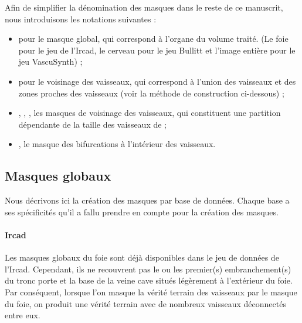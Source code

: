 Afin de simplifier la dénomination des masques dans le reste de ce manuscrit, nous introduisons les notations suivantes :
\begin{itemize}
  \item \maskglobal pour le masque global, qui correspond à l'organe du volume traité. (Le foie pour le jeu de l'Ircad, le cerveau pour le jeu Bullitt et l'image entière pour le jeu VascuSynth) ;
  \item \maskvascular pour le voisinage des vaisseaux, qui correspond à l'union des vaisseaux et des zones proches des vaisseaux (voir la méthode de construction ci-dessous) ;
  \item \maskvesselLarge, \maskvesselMedium, \maskvesselSmall, les masques de voisinage des vaisseaux, qui constituent une partition dépendante de la taille des vaisseaux de \maskvascular;
  \item \maskbif, le masque des bifurcations à l'intérieur des vaisseaux.
  \end{itemize}
\subsection{Masques globaux}
Nous décrivons ici la création des masques par base de données. Chaque base a ses spécificités qu'il a fallu prendre en compte pour la création des masques.
\paragraph{Ircad}
Les masques globaux du foie sont déjà disponibles dans le jeu de données de l'Ircad. Cependant, ils ne recouvrent pas le ou les premier(s) embranchement(s) du tronc porte et la base de la veine cave situés légèrement à l'extérieur du foie. Par conséquent, lorsque l'on masque la vérité terrain des vaisseaux par le masque du foie, on produit une vérité terrain avec de nombreux vaisseaux déconnectés entre eux. 


